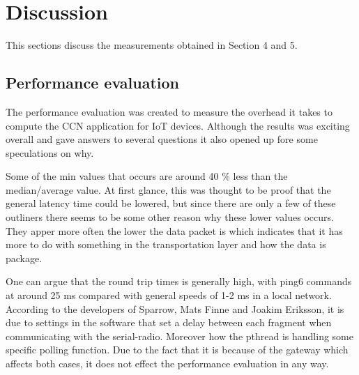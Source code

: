 \section{Discussion}
This sections discuss the measurements obtained in Section 4 and 5.

\subsection{Performance evaluation}
The performance evaluation was created to measure the overhead it takes to compute the CCN application for IoT devices. Although the results was exciting overall and gave answers to several questions it also opened up fore some speculations on why.

Some of the min values that occurs are around 40 $\%$ less than the median/average value. At first glance, this was thought to be proof that the general latency time could be lowered, but since there are only a few of these outliners there seems to be some other reason why these lower values occurs. They apper more often the lower the data packet is which indicates that it has more to do with something in the transportation layer and how the data is package.

One can argue that the round trip times is generally high, with ping6 commands at around 25 ms compared with general speeds of 1-2 ms in a local network. According to the developers of Sparrow, Mats Finne and Joakim Eriksson, it is due to settings in the software that set a delay between each fragment when communicating with the serial-radio. Moreover how the pthread is handling some specific polling function. Due to the fact that it is because of the gateway which affects both cases, it does not effect the performance evaluation in any way.

